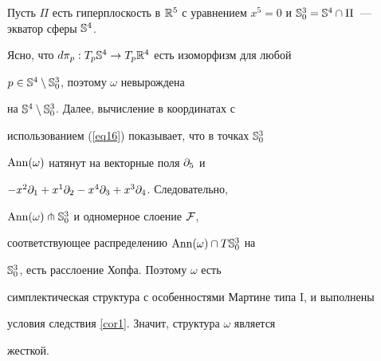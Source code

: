 \begin{examnonum}
Пусть $\Pi$ есть гиперплоскость в $\R^5$ с уравнением $x^5=0$ и $\SS^3_0 =


\SS^4 \cap


\Pi$~--- экватор сферы $\SS^4$.


Ясно, что $d\pi_p : T_p{\Bbb S}^4 \to T_p{\Bbb R}^4$ есть изоморфизм для любой


$p \in {\Bbb S}^4 \setminus {\Bbb S}^3_0$, поэтому $\omega$ невырождена


на ${\Bbb S}^4 \setminus {\Bbb S}^3_0$. Далее, вычисление в координатах с


использованием (\ref{eq16}) показывает, что в точках ${\Bbb S}^3_0$


$\operatorname{Ann}(\omega)$ натянут на векторные поля ${\partial}_5$ и


$-x^2{\partial}_1 + x^1{\partial}_2 - x^4{\partial}_3 + x^3{\partial}_4$. Следовательно,


$\operatorname{Ann}(\omega) \pitchfork {\Bbb S}^3_0$ и одномерное слоение $\cal F$,


соответствующее распределению $\operatorname{Ann}(\omega) \cap T{\Bbb S}^3_0$ на


${\Bbb S}^3_0$, есть расслоение Хопфа. Поэтому $\omega$ есть


симплектическая структура с особенностями Мартине типа I, и выполнены


условия следствия \ref{cor1}. Значит, структура $\omega$ является


жесткой.


\end{examnonum}









